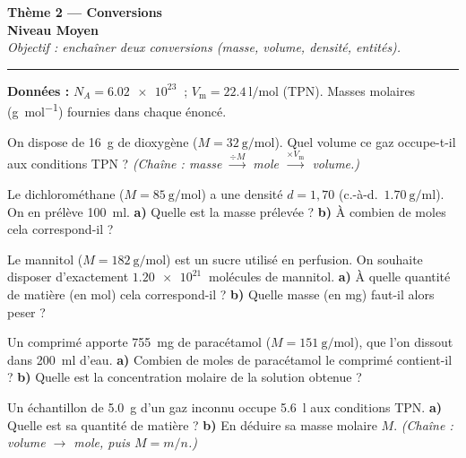 \documentclass[11pt,a4paper]{article}
\newcommand{\gmol}{\si{\gram\per\mole}}
\newcommand{\Vm}{V_{\mathrm m}}
\begin{document}
\begin{center}
{\LARGE\bfseries\color{primarydark}Thème 2 — Conversions}\\[1pt]
{\large\color{moycol}\textbf{Niveau Moyen}}\\[2pt]
{\itshape Objectif : enchaîner deux conversions (masse, volume, densité, entités).}\\
{\color{primary}\rule{0.6\linewidth}{1pt}}
\end{center}

\textbf{Données :} $N_A=\SI{6,02e23}{}$ ; $\Vm=\SI{22,4}{\litre\per\mole}$ (TPN).\quad
Masses molaires (\gmol) fournies dans chaque énoncé.

\begin{exo}
On dispose de \SI{16}{\gram} de dioxygène  ($M=\SI{32}{\gram\per\mole}$).
Quel volume ce gaz occupe-t-il aux conditions TPN ?
\emph{(Chaîne : masse $\xrightarrow{\div M}$ mole $\xrightarrow{\times \Vm}$ volume.)}
\end{exo}

\begin{exo}
Le dichlorométhane  ($M=\SI{85}{\gram\per\mole}$) a une densité $d=1{,}70$
(c.-à-d.\ $\SI{1,70}{\gram\per\milli\litre}$). On en prélève \SI{100}{\milli\litre}.
\textbf{a)} Quelle est la masse prélevée ?\quad
\textbf{b)} À combien de moles cela correspond-il ?
\end{exo}

\begin{exo}
Le mannitol ($M=\SI{182}{\gram\per\mole}$) est un sucre utilisé en perfusion. On souhaite disposer
d'exactement $\SI{1,20e21}{}$ molécules de mannitol.
\textbf{a)} À quelle quantité de matière (en mol) cela correspond-il ?\quad
\textbf{b)} Quelle masse (en mg) faut-il alors peser ?
\end{exo}

\begin{exo}
Un comprimé apporte \SI{755}{\milli\gram} de paracétamol 
($M=\SI{151}{\gram\per\mole}$), que l'on dissout dans \SI{200}{\milli\litre} d'eau.
\textbf{a)} Combien de moles de paracétamol le comprimé contient-il ?\quad
\textbf{b)} Quelle est la concentration molaire de la solution obtenue ?
\end{exo}

\begin{exo}
Un échantillon de \SI{5,0}{\gram} d'un gaz inconnu occupe \SI{5,6}{\litre} aux conditions TPN.
\textbf{a)} Quelle est sa quantité de matière ?\quad
\textbf{b)} En déduire sa masse molaire $M$. \emph{(Chaîne : volume $\to$ mole, puis $M=m/n$.)}
\end{exo}
\end{document}
